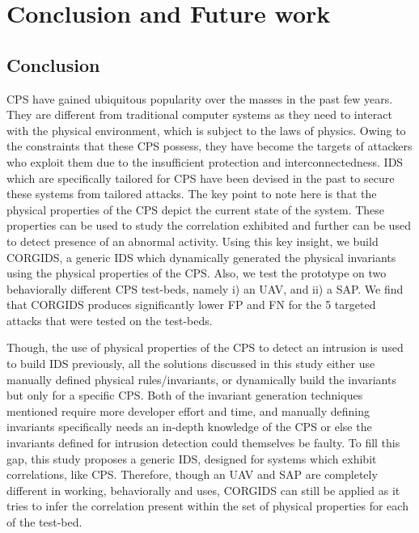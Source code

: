 
\chapter{\textbf{Conclusion and Future work}}
\label{sec8:Conclusion}

\section{Conclusion}

\ac{CPS} have gained ubiquitous popularity over the masses in the past few years. They are different from traditional computer systems as they need to interact with the physical environment, which is subject to the laws of physics. Owing to the constraints that these \ac{CPS} possess, they have become the targets of attackers who exploit them due to the insufficient protection and interconnectedness. \ac{IDS} which are specifically tailored for \ac{CPS} have been devised in the past to secure these systems from tailored attacks. The key point to note here is that the physical properties of the \ac{CPS} depict the current state of the system. These properties can be used to study the correlation exhibited and further can be used to detect presence of an abnormal activity. Using this key insight, we build \acf{CORGIDS}, a generic \ac{IDS} which dynamically generated the physical invariants using the physical properties of the \ac{CPS}. Also, we test the prototype on two behaviorally different \ac{CPS} test-beds, namely i) an \ac{UAV}, and ii) a \acf{SAP}. We find that \ac{CORGIDS} produces significantly lower \ac{FP} and \ac{FN} for the 5 targeted attacks that were tested on the test-beds.

Though, the use of physical properties of the \ac{CPS} to detect an intrusion is used to build \ac{IDS} previously, all the solutions discussed in this study either use manually defined physical rules/invariants, or dynamically build the invariants but only for a specific \ac{CPS}. Both of the invariant generation techniques mentioned require more developer effort and time, and manually defining invariants specifically needs an in-depth knowledge of the \ac{CPS} or else the invariants defined for intrusion detection could themselves be faulty. To fill this gap, this study proposes a generic \ac{IDS}, designed for systems which exhibit correlations, like \ac{CPS}. Therefore, though an \ac{UAV} and \ac{SAP} are completely different in working, behaviorally and uses, \ac{CORGIDS} can still be applied as it tries to infer the correlation present within the set of physical properties for each of the test-bed.
 
